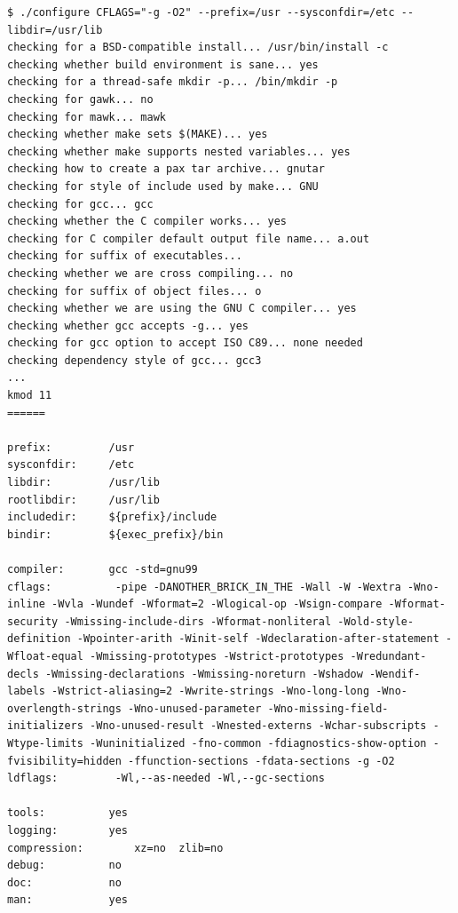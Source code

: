 \documentclass[11pt,a4paper]{article}
\begin{document}
{\begin{shaded}\begin{verbatim}
$ ./configure CFLAGS="-g -O2" --prefix=/usr --sysconfdir=/etc --libdir=/usr/lib
checking for a BSD-compatible install... /usr/bin/install -c
checking whether build environment is sane... yes
checking for a thread-safe mkdir -p... /bin/mkdir -p
checking for gawk... no
checking for mawk... mawk
checking whether make sets $(MAKE)... yes
checking whether make supports nested variables... yes
checking how to create a pax tar archive... gnutar
checking for style of include used by make... GNU
checking for gcc... gcc
checking whether the C compiler works... yes
checking for C compiler default output file name... a.out
checking for suffix of executables... 
checking whether we are cross compiling... no
checking for suffix of object files... o
checking whether we are using the GNU C compiler... yes
checking whether gcc accepts -g... yes
checking for gcc option to accept ISO C89... none needed
checking dependency style of gcc... gcc3
...
kmod 11
======

prefix:         /usr
sysconfdir:     /etc
libdir:         /usr/lib
rootlibdir:     /usr/lib
includedir:     ${prefix}/include
bindir:         ${exec_prefix}/bin

compiler:       gcc -std=gnu99
cflags:          -pipe -DANOTHER_BRICK_IN_THE -Wall -W -Wextra -Wno-inline -Wvla -Wundef -Wformat=2 -Wlogical-op -Wsign-compare -Wformat-security -Wmissing-include-dirs -Wformat-nonliteral -Wold-style-definition -Wpointer-arith -Winit-self -Wdeclaration-after-statement -Wfloat-equal -Wmissing-prototypes -Wstrict-prototypes -Wredundant-decls -Wmissing-declarations -Wmissing-noreturn -Wshadow -Wendif-labels -Wstrict-aliasing=2 -Wwrite-strings -Wno-long-long -Wno-overlength-strings -Wno-unused-parameter -Wno-missing-field-initializers -Wno-unused-result -Wnested-externs -Wchar-subscripts -Wtype-limits -Wuninitialized -fno-common -fdiagnostics-show-option -fvisibility=hidden -ffunction-sections -fdata-sections -g -O2
ldflags:         -Wl,--as-needed -Wl,--gc-sections 

tools:          yes
logging:        yes
compression:        xz=no  zlib=no
debug:          no
doc:            no
man:            yes
\end{verbatim}\end{shaded}}
\end{document}

